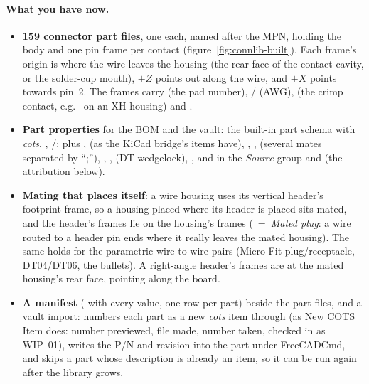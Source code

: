 \paragraph{What you have now.}
\begin{itemize}[nosep]
  \item \textbf{159 connector part files}, one  each, named after the MPN, holding the body and one
        pin frame per contact (figure~\ref{fig:connlib-built}). Each frame's origin is where the wire leaves the
        housing (the rear face of the contact cavity, or the solder-cup mouth), $+Z$ points out along the wire, and
        $+X$ points towards pin~2. The frames carry  (the pad number), /
        (AWG),  (the crimp contact, e.g.\  on an XH housing) and .
  \item \textbf{Part properties} for the BOM and the vault: the built-in part schema with 
        \emph{cots}, , /; plus ,
         (as the KiCad bridge's items have), ,
        ,  (several mates separated by ``;''), , ,
         (DT wedgelock), , and in the \emph{Source} group  and
         (the attribution below).
  \item \textbf{Mating that places itself}: a wire housing uses its vertical header's footprint frame, so a housing
        placed where its header is placed sits mated, and the header's frames lie on the housing's frames
        (~=~\emph{Mated plug}: a wire routed to a header pin ends where it really leaves the mated
        housing). The same holds for the parametric wire-to-wire pairs (Micro-Fit plug/receptacle, DT04/DT06, the
        bullets). A right-angle header's frames are at the mated housing's rear face, pointing along the board.
  \item \textbf{A manifest} ( with every value,  one row per part) beside the
        part files, and a vault import:  numbers each part as a new \emph{cots} item
        through  (as New COTS Item does: number previewed, file made, number taken,
        checked in as WIP~01), writes the P/N and revision into the part under FreeCADCmd, and skips a part whose
        description is already an item, so it can be run again after the library grows.
\end{itemize}


